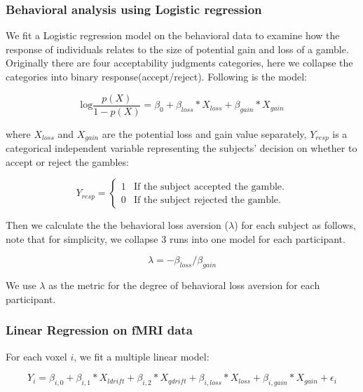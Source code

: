 \documentclass[11pt]{article}
\begin{document}
\subsubsection{Behavioral analysis using Logistic regression}

We fit a Logistic regression model on the behavioral data to examine how the response of individuals relates to the size of potential gain and loss of a gamble. Originally there are four acceptability judgments categories, here we collapse the categories into binary response(accept/reject). Following is the model:

\begin{equation}
\textrm{log}\frac{p(X)}{1-p(X)} = \beta_0 + \beta_{loss} *X_{loss} + \beta_{gain} * X_{gain}
\end{equation}

where $X_{loss}$ and $X_{gain}$ are the potential loss and gain value separately, $Y_{resp}$ is a categorical independent variable representing the subjects' decision on whether to accept or reject the gambles:

\begin{displaymath}
Y_{resp} = \left \{ \begin{array}{ll}
1 & \textrm{If the subject accepted the gamble.} \\
0 & \textrm{If the subject rejected the gamble.}
\end{array} \right .
\end{displaymath}

Then we calculate the the behavioral loss aversion ($ \lambda $) for each subject as follows, note that for simplicity, we collapse 3 runs into one model for each participant.

\begin{equation}
\lambda = -\beta_{loss} / \beta_{gain}
\end{equation}

We use $\lambda$ as the metric for the degree of behavioral loss aversion for each participant. 

\subsubsection{Linear Regression on fMRI data}

For each voxel $i$, we fit a multiple linear model:

\begin{equation}
Y_{i} = \beta_{i, 0} + \beta_{i,1} *X_{ldrift} + \beta_{i, 2} * X_{qdrift} + \beta_{i, loss} *X_{loss} + \beta_{i, gain} * X_{gain}  + 
\epsilon_i
\end{equation}
\end{document}
